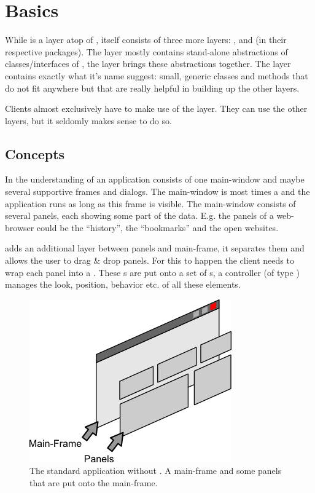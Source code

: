 \section{Basics}
While  is a layer atop of ,  itself consists of three more layers: ,  and  (in their respective packages). The  layer mostly contains stand-alone abstractions of classes/interfaces of , the  layer brings these abstractions together. The  layer contains exactly what it's name suggest: small, generic classes and methods that do not fit anywhere but that are really helpful in building up the other layers.

Clients almost exclusively have to make use of the  layer. They can use the other layers, but it seldomly makes sense to do so.

\subsection{Concepts}
In the understanding of  an application consists of one main-window and maybe several supportive frames and dialogs. The main-window is most times a  and the application runs as long as this frame is visible. The main-window consists of several panels, each showing some part of the data. E.g. the panels of a web-browser could be the ``history'', the ``bookmarks'' and the open websites.

 adds an additional layer between panels and main-frame, it separates them and allows the user to drag \& drop panels. For this to happen the client needs to wrap each panel into a . These s are put onto a set of s, a controller (of type ) manages the look, position, behavior etc. of all these elements. 

\begin{figure}[ht]
\centering
\includegraphics[scale=1]{basics/app_without}
\caption{The standard application without . A main-frame and some panels that are put onto the main-frame.}
\label{fig:app_without}
\end{figure}


